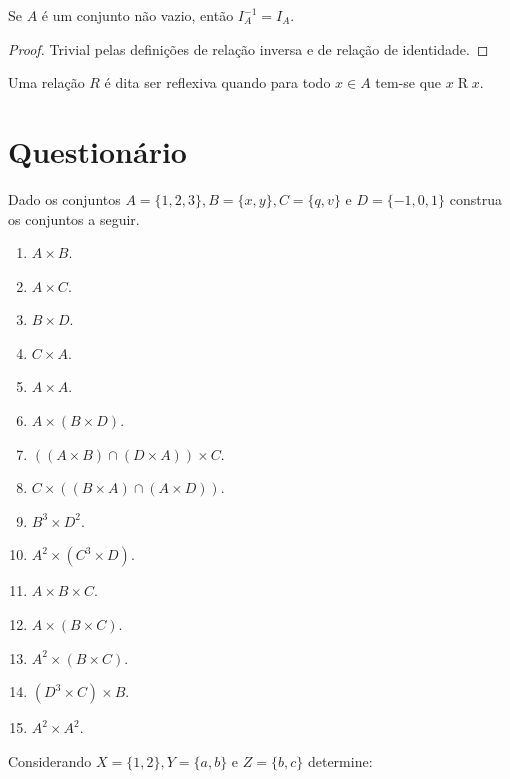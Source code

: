 \begin{prop}
	Se $A$ é um conjunto não vazio, então $I_A^{-1} = I_A$.
\end{prop}

\begin{proof}
	Trivial pelas definições de relação inversa e de relação de identidade.
\end{proof}

\begin{definition}[Reflexividade]\label{def:RelacaoReflexiva}
	Uma relação $R$ é dita ser reflexiva quando para todo $x \in A$ tem-se que $x \mathrel{R} x$.
\end{definition}

\section{Questionário}

\begin{exercise}\label{exerc:Relcacoes1}
	Dado os conjuntos $A = \{1, 2, 3\}, B = \{x, y\}, C = \{q, v\}$ e $D = \{-1, 0, 1\}$ construa os conjuntos a seguir.
\end{exercise}

\begin{enumerate}
	\item $A \times B$.
	\item $A \times C$.
	\item $B \times D$.
	\item $C \times A$.
	\item $A \times A$.
	\item $A \times (B \times D)$.
	\item $((A \times B) \cap (D \times A)) \times C$.
	\item $C \times ((B \times A) \cap (A \times D))$.
	\item $B^3 \times D^2$.
	\item $A^2 \times (C^3 \times D)$.
	\item $A \times B \times C$.
	\item $A \times (B \times C)$.
	\item $A^2 \times (B \times C)$.
	\item $(D^3 \times C) \times B$.
	\item $A^2 \times A^2$.
\end{enumerate}

\begin{exercise}\label{exerc:Relcacoes2}
	Considerando $X = \{1, 2\}, Y = \{a, b\}$ e $Z = \{b, c\}$ determine:
\end{exercise}

